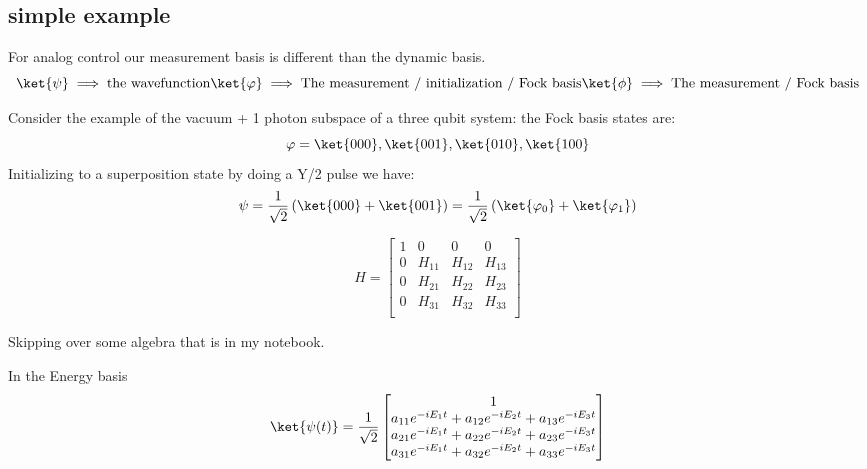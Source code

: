 {\subsection{simple example}
For analog control our measurement basis is different than the dynamic basis.
\begin{equation*}
    \ket{\psi} \implies \textrm{the wavefunction}
    \ket{\varphi} \implies \textrm{The measurement / initialization / Fock basis}
    \ket{\phi} \implies \textrm{The measurement / Fock basis}
\end{equation*}

Consider the example of the vacuum + 1 photon subspace of a three qubit system:
the Fock basis states are:
\begin{equation*}
    \varphi = \ket{000}, \ket{001}, \ket{010}, \ket{100}
\end{equation*}
Initializing to a superposition state by doing a Y/2 pulse we have:
\begin{equation*}
    \psi = \frac{1}{\sqrt{2}} \left( \ket{000} + \ket{001} \right) = \frac{1}{\sqrt{2}} \left( \ket{\varphi_0} + \ket{\varphi_1} \right)
\end{equation*}

\begin{equation}
    H=
    \begin{bmatrix}
        1 & 0 & 0 & 0 \\
        0 & H_{11} & H_{12} & H_{13} \\
        0 & H_{21} & H_{22} & H_{23} \\
        0 & H_{31} & H_{32} & H_{33} \\
    \end{bmatrix}
\end{equation}

Skipping over some algebra that is in my notebook.

In the Energy basis
\begin{equation}
    \ket{\psi (t)} = \frac{1}{\sqrt{2}}
    \begin{bmatrix}
        1 \\
        a_{11} e^{-i E_1 t} + a_{12} e^{-i E_2 t} + a_{13} e^{-i E_3 t} \\
        a_{21} e^{-i E_1 t} + a_{22} e^{-i E_2 t} + a_{23} e^{-i E_3 t} \\
        a_{31} e^{-i E_1 t} + a_{32} e^{-i E_2 t} + a_{33} e^{-i E_3 t}
    \end{bmatrix}
\end{equation}

}
